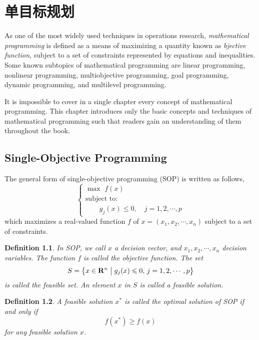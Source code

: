 \chapter{单目标规划}

As one of the most widely used techniques in operations
research, \emph{ mathematical programming} is defined as a means of maximizing a
quantity known as \emph{bjective function}, subject to a set of constraints
represented by equations and inequalities. Some known subtopics of mathematical
programming are linear programming, nonlinear programming, multiobjective
programming, goal programming, dynamic programming, and multilevel
programming.

It is impossible to cover in a single chapter every concept of mathematical
programming. This chapter introduces only the basic concepts and techniques of
mathematical programming such that readers gain an understanding of them
throughout the book.


\section{Single-Objective Programming}
The general form of single-objective programming (SOP) is written
as follows,
\begin{equation*} %
\left\{\begin{array}{l}
\max \,\,f(x)\\[0.1 cm]
\mbox{subject to:} \\ [0.1 cm]
\qquad g_j(x)\le 0,\quad j=1,2,\cdots,p
\end{array}\right.
\end{equation*}
which maximizes a real-valued function $f$ of
$x=(x_1,x_2,\cdots,x_n)$ subject to a set of constraints.

\newcommand\Real{\mathbf{R}}
\newtheorem{mpdef}{Definition}[chapter]
\begin{mpdef}
In SOP, we call $x$ a decision vector, and
$x_1,x_2,\cdots,x_n$ decision variables. The function
$f$ is called the objective function. The set
\begin{equation*}
S=\left\{x\in\Real^n\bigm|g_j(x)\le 0,\,j=1,2,\cdots,p\right\}
\end{equation*}
is called the feasible set. An element $x$ in $S$ is called a
feasible solution.
\end{mpdef}

\newtheorem{mpdefop}[mpdef]{Definition}
\begin{mpdefop}
A feasible solution $x^*$ is called the optimal
solution of SOP if and only if
\begin{equation}
f(x^*)\ge f(x)
\end{equation}
for any feasible solution $x$.
\end{mpdefop}

